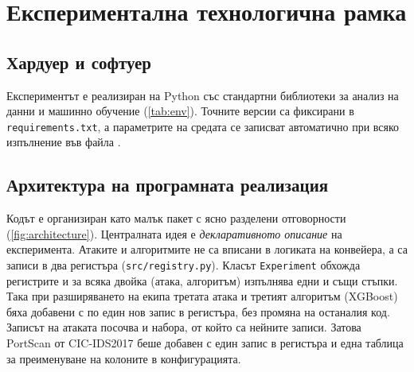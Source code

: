 \chapter{Експериментална технологична рамка}\label{ch:framework}

\section{Хардуер и софтуер}
Експериментът е реализиран на Python със стандартни библиотеки за анализ на данни и машинно обучение (\cref{tab:env}). Точните версии са фиксирани в \texttt{requirements.txt}, а параметрите на средата се записват автоматично при всяко изпълнение във файла .

\begin{table}[!htbp]
\centering\small
\caption{Експериментална среда}\label{tab:env}

\end{table}

\section{Архитектура на програмната реализация}
Кодът е организиран като малък пакет с ясно разделени отговорности (\cref{fig:architecture}). Централната идея е \emph{декларативното описание} на експеримента. Атаките и алгоритмите не са вписани в логиката на конвейера, а са записи в два регистъра (\texttt{src/registry.py}). Класът \texttt{Experiment} обхожда регистрите и за всяка двойка (атака, алгоритъм) изпълнява едни и същи стъпки. Така при разширяването на екипа третата атака и третият алгоритъм (XGBoost) бяха добавени с по един нов запис в регистъра, без промяна на останалия код. Записът на атаката посочва и набора, от който са нейните записи. Затова PortScan от CIC-IDS2017 беше добавен с един запис в регистъра и една таблица за преименуване на колоните в конфигурацията.

